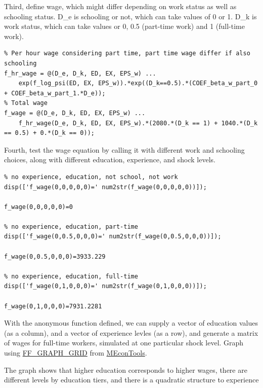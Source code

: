 \documentclass[
]{book}
\begin{document}
Third, define wage, which might differ depending on work status as well
as schooling status. D\_e is schooling or not, which can take values of 0
or 1. D\_k is work status, which can take values or 0, 0.5 (part-time
work) and 1 (full-time work).

\begin{verbatim}
% Per hour wage considering part time, part time wage differ if also schooling
f_hr_wage = @(D_e, D_k, ED, EX, EPS_w) ...
    exp(f_log_psi(ED, EX, EPS_w)).*exp((D_k==0.5).*(COEF_beta_w_part_0 + COEF_beta_w_part_1.*D_e));
% Total wage
f_wage = @(D_e, D_k, ED, EX, EPS_w) ...
    f_hr_wage(D_e, D_k, ED, EX, EPS_w).*(2080.*(D_k == 1) + 1040.*(D_k == 0.5) + 0.*(D_k == 0));
\end{verbatim}

Fourth, test the wage equation by calling it with different work and
schooling choices, along with different education, experience, and shock
levels.

\begin{verbatim}
% no experience, education, not school, not work
disp(['f_wage(0,0,0,0,0)=' num2str(f_wage(0,0,0,0,0))]);

f_wage(0,0,0,0,0)=0

% no experience, education, part-time
disp(['f_wage(0,0.5,0,0,0)=' num2str(f_wage(0,0.5,0,0,0))]);

f_wage(0,0.5,0,0,0)=3933.229

% no experience, education, full-time
disp(['f_wage(0,1,0,0,0)=' num2str(f_wage(0,1,0,0,0))]);

f_wage(0,1,0,0,0)=7931.2281
\end{verbatim}

With the anonymous function defined, we can supply a vector of education
values (as a column), and a vector of experience levles (as a row), and
generate a matrix of wages for full-time workers, simulated at one
particular shock level. Graph using
\href{https://fanwangecon.github.io/MEconTools/MEconTools/doc/graph/htmlpdfm/fx_graph_grid.html}{FF\_GRAPH\_GRID}
from \href{https://fanwangecon.github.io/MEconTools/}{MEconTools}.

The graph shows that higher education corresponds to higher wages, there
are different levels by education tiers, and there is a quadratic
structure to experience
\end{document}
